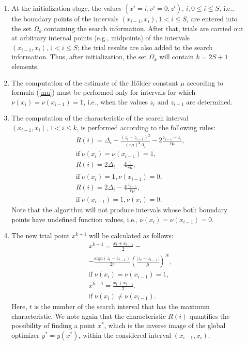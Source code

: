 \documentclass[iicol]{sn-jnl}
\theoremstyle{thmstyleone}%
\theoremstyle{thmstyletwo}%
\theoremstyle{thmstylethree}%
\begin{document}
\begin{enumerate}[1.]
\item At the initialization stage, the values $(x^i = i, \nu^i=0, z^i)$, $ i, 0\leq i \leq S$, i.e., the boundary points of the intervals $(x_{i-1},x_i), 1<i\leq S$, are entered into the set $\Omega_k$ containing the search  information. 
After that, trials are carried out at arbitrary internal points (e.g., midpoints) of the intervals $(x_{i-1},x_i), 1<i\leq S$; the trial results are also added to the search information. Thus, after initialization, the set $\Omega_k$ will contain $k=2S+1$ elements.

\item The computation of the estimate of the H\"older constant $\mu$ according to formula (\ref{mu}) must be performed only for intervals for which $\nu(x_i) = \nu(x_{i-1}) = 1$, i.e., when the values $z_i$ and $z_{i-1}$ are determined.

\item The computation of the characteristic of the search interval $(x_{i-1},x_i), 1<i\leq k$, is performed according to the following rules:
\begin{equation}\label{R_int}
\begin{aligned}
&R(i) = \Delta_i + \frac{(z_i-z_{i-1})^2}{(r\mu)^2\Delta_i}-2\frac{z_{i-1}+z_i}{r\mu},\\
&\mathrm{if} \; \nu(x_i) = \nu(x_{i-1}) = 1,  \\ 
&R(i) = 2\Delta_i-4\frac{z_i}{r\mu},\\
&\mathrm{if} \; \nu(x_i) = 1, \nu(x_{i-1}) = 0,  \\ 
&R(i) = 2\Delta_i-4\frac{z_{i-1}}{r\mu},\\
&\mathrm{if} \; \nu(x_{i-1}) = 1, \nu(x_{i}) = 0. \nonumber
\end{aligned}
\end{equation}
Note that the algorithm will not produce intervals whose both boundary points have undefined function values, i.e., $\nu(x_i) = \nu(x_{i-1}) = 0$.

\item The new trial point $x^{k+1}$ will be calculated as follows:
\begin{equation}\label{xk1_int}
\begin{aligned}
&x^{k+1}=\frac{x_t+x_{t-1}}{2}-\\
&-\frac{\mathrm{sign}(z_t-z_{t-1})}{2r}\left(\frac{\left|z_t-z_{t-1}\right|}{\mu}\right)^N,\\
&\mathrm{if} \; \nu(x_i) = \nu(x_{i-1}) = 1,\\
&x^{k+1} = \frac{x_t+x_{t-1}}{2},\\
&\mathrm{if} \; \nu(x_i) \neq \nu(x_{i-1}). \nonumber
\end{aligned}
\end{equation}
Here, $t$ is the number of the search interval that has the maximum characteristic.
We note again that the characteristic $R(i)$ quantifies the possibility of finding a point $x^*$, which is the inverse image of the global optimizer $y^* = y(x^*)$, within the considered interval $(x_{i-1},x_i)$.
\end{enumerate}
\end{document}
